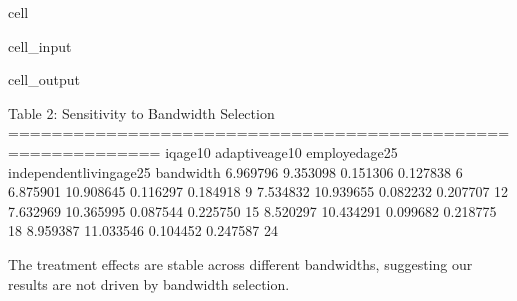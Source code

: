 \documentclass[letterpaper,10pt,english]{jupyterBook}
\begin{document}
\begin{sphinxuseclass}{cell}\begin{sphinxVerbatimInput}

\begin{sphinxuseclass}{cell_input}
\begin{sphinxVerbatim}[commandchars=\\\{\}]
\end{sphinxVerbatim}

\end{sphinxuseclass}\end{sphinxVerbatimInput}
\begin{sphinxVerbatimOutput}

\begin{sphinxuseclass}{cell_output}
\begin{sphinxVerbatim}[commandchars=\\\{\}]
Table 2: Sensitivity to Bandwidth Selection
============================================================
 iq\PYGZus{}age\PYGZus{}10  adaptive\PYGZus{}age\PYGZus{}10  employed\PYGZus{}age\PYGZus{}25  independent\PYGZus{}living\PYGZus{}age\PYGZus{}25  bandwidth
  6.969796         9.353098         0.151306                   0.127838          6
  6.875901        10.908645         0.116297                   0.184918          9
  7.534832        10.939655         0.082232                   0.207707         12
  7.632969        10.365995         0.087544                   0.225750         15
  8.520297        10.434291         0.099682                   0.218775         18
  8.959387        11.033546         0.104452                   0.247587         24
\end{sphinxVerbatim}

\end{sphinxuseclass}\end{sphinxVerbatimOutput}

\end{sphinxuseclass}
\sphinxAtStartPar
The treatment effects are stable across different bandwidths, suggesting our results are not driven by bandwidth selection.
\end{document}
